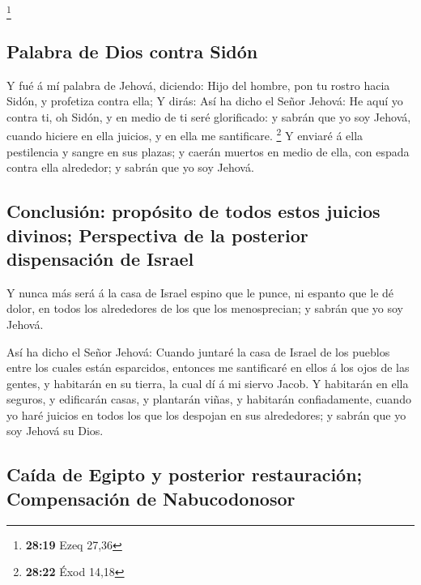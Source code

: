 \footnote{\textbf{28:19} Ezeq 27,36}

\hypertarget{palabra-de-dios-contra-siduxf3n}{%
\subsection{Palabra de Dios contra
Sidón}\label{palabra-de-dios-contra-siduxf3n}}

 Y fué á mí palabra de Jehová, diciendo:  Hijo
del hombre, pon tu rostro hacia Sidón, y profetiza contra ella;
 Y dirás: Así ha dicho el Señor Jehová: He aquí yo contra
ti, oh Sidón, y en medio de ti seré glorificado: y sabrán que yo soy
Jehová, cuando hiciere en ella juicios, y en ella me santificare.
\footnote{\textbf{28:22} Éxod 14,18}  Y enviaré á ella
pestilencia y sangre en sus plazas; y caerán muertos en medio de ella,
con espada contra ella alrededor; y sabrán que yo soy Jehová.

\hypertarget{conclusiuxf3n-propuxf3sito-de-todos-estos-juicios-divinos-perspectiva-de-la-posterior-dispensaciuxf3n-de-israel}{%
\subsection{Conclusión: propósito de todos estos juicios divinos;
Perspectiva de la posterior dispensación de
Israel}\label{conclusiuxf3n-propuxf3sito-de-todos-estos-juicios-divinos-perspectiva-de-la-posterior-dispensaciuxf3n-de-israel}}

 Y nunca más será á la casa de Israel espino que le punce,
ni espanto que le dé dolor, en todos los alrededores de los que los
menosprecian; y sabrán que yo soy Jehová.

 Así ha dicho el Señor Jehová: Cuando juntaré la casa de
Israel de los pueblos entre los cuales están esparcidos, entonces me
santificaré en ellos á los ojos de las gentes, y habitarán en su tierra,
la cual dí á mi siervo Jacob.  Y habitarán en ella seguros,
y edificarán casas, y plantarán viñas, y habitarán confiadamente, cuando
yo haré juicios en todos los que los despojan en sus alrededores; y
sabrán que yo soy Jehová su Dios.

\hypertarget{cauxedda-de-egipto-y-posterior-restauraciuxf3n-compensaciuxf3n-de-nabucodonosor}{%
\subsection{Caída de Egipto y posterior restauración; Compensación de
Nabucodonosor}\label{cauxedda-de-egipto-y-posterior-restauraciuxf3n-compensaciuxf3n-de-nabucodonosor}}

